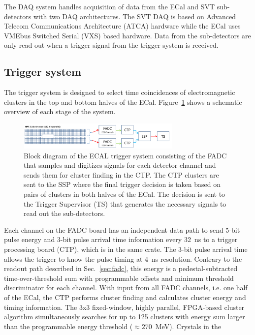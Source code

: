 \documentclass[final,3p,times,twocolumn]{elsarticle}
\begin{document}
The DAQ system handles acquisition of data from the ECal and SVT sub-detectors  with 
two DAQ architectures. The SVT DAQ is based on Advanced Telecom Communications Architecture 
(ATCA) hardware while the ECal uses VMEbus Switched Serial (VXS) based hardware. Data from the 
sub-detectors are only read out when a trigger signal from the trigger system is received.

\subsection{Trigger system}
\label{sec:trigger}
The trigger system is designed to select time coincidences of electromagnetic clusters in the 
top and bottom halves of the ECal. Figure~\ref{fig:hps_trigger_cal} shows a schematic overview 
of each stage of the system. 
 \begin{figure}[b]
\begin{center}
{\small
 \includegraphics[width=8cm]{figures/hps_trigger_cal}
\caption{Block diagram of the ECAL trigger system consisting of the FADC that samples and digitizes 
signals for each detector channel and sends them for cluster finding in the CTP. The CTP clusters are 
sent to the SSP where the final trigger decision is taken based on pairs of clusters in both halves of the 
ECal. The decision is sent to the Trigger Supervisor (TS) that generates the necessary signals to read out 
the sub-detectors.}
 \label{fig:hps_trigger_cal}
}
\end{center}
 \end{figure}
Each channel on the FADC board has an independent data path to send 5-bit pulse energy and 3-bit 
pulse arrival time information every 32~ns to a trigger processing board (CTP), which is in the same 
crate. The 3-bit pulse arrival time allows the trigger to know the pulse timing at 4~ns resolution. 
Contrary to the readout path 
described in Sec.~\ref{sec:fadc}, this energy is a pedestal-subtracted time-over-threshold sum with 
programmable offsets and minimum threshold discriminator for each channel. With input from all 
FADC channels, i.e. one half of the ECal, the CTP performs cluster finding and calculates cluster 
energy and timing information. The 3x3 fixed-window, highly parallel, FPGA-based cluster 
algorithm simultaneously searches for up to 125 clusters with energy sum larger than 
the programmable energy threshold ($\approx270$~MeV). Crystals in the 
\end{document}
